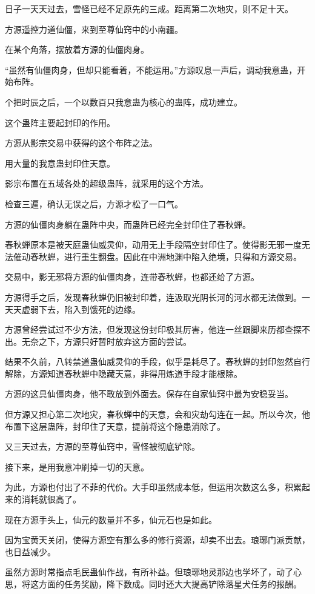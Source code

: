 \begin{this_body}
日子一天天过去，雪怪已经不足原先的三成。距离第二次地灾，则不足十天。

方源遥控力道仙僵，来到至尊仙窍中的小南疆。

在某个角落，摆放着方源的仙僵肉身。

“虽然有仙僵肉身，但却只能看着，不能运用。”方源叹息一声后，调动我意蛊，开始布阵。

个把时辰之后，一个以数百只我意蛊为核心的蛊阵，成功建立。

这个蛊阵主要起封印的作用。

方源从影宗交易中获得的这个布阵之法。

用大量的我意蛊封印住天意。

影宗布置在五域各处的超级蛊阵，就采用的这个方法。

检查三遍，确认无误之后，方源才松了一口气。

方源的仙僵肉身躺在蛊阵中央，而蛊阵已经完全封印住了春秋蝉。

春秋蝉原本是被天庭蛊仙威灵仰，动用无上手段隔空封印住了。使得影无邪一度无法催动春秋蝉，进行重生翻盘。因此在中洲地渊中陷入绝境，只得和方源交易。

交易中，影无邪将方源的仙僵肉身，连带春秋蝉，也都还给了方源。

方源得手之后，发现春秋蝉仍旧被封印着，连汲取光阴长河的河水都无法做到。一天天虚弱下去，陷入到饿死的边缘。

方源曾经尝试过不少方法，但发现这份封印极其厉害，他连一丝跟脚来历都查探不出。无奈之下，方源只好暂时放弃这方面的尝试。

结果不久前，八转禁道蛊仙威灵仰的手段，似乎是耗尽了。春秋蝉的封印忽然自行解除，方源知道春秋蝉中隐藏天意，非得用炼道手段才能根除。

方源的这具仙僵肉身，他不敢放到外面去。保存在自家仙窍中最为安稳妥当。

但方源又担心第二次地灾，春秋蝉中的天意，会和灾劫勾连在一起。所以今次，他布置下这层蛊阵，封印住了天意，提前将这个隐患消除了。

又三天过去，方源的至尊仙窍中，雪怪被彻底铲除。

接下来，是用我意冲刷掉一切的天意。

为此，方源也付出了不菲的代价。大手印虽然成本低，但运用次数这么多，积累起来的消耗就很高了。

现在方源手头上，仙元的数量并不多，仙元石也是如此。

因为宝黄天关闭，使得方源空有那么多的修行资源，却卖不出去。琅琊门派贡献，也日益减少。

虽然方源时常指点毛民蛊仙作战，有所补益。但琅琊地灵那边也学坏了，动了心思，将这方面的任务奖励，降下数成。同时还大大提高铲除落星犬任务的报酬。


\end{this_body}
